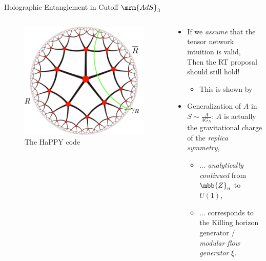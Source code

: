 \documentclass[aspectratio=169,10pt
	,noamsthm
]{beamer}
\begin{document}
\begin{frame}{Holographic Entanglement in Cutoff $\mrm{AdS}_3$}{%
	\textcite{Lewkowycz:2019xse}%
}
	\begin{columns}
	\begin{column}{.35\textwidth}
		\begin{figure}[!h]
		\centering
		\includegraphics[height=.55\textheight]{img/cutnetwork.pdf}
		\caption{The HaPPY code \cite{Pastawski:2015qua,Harlow:2018fse}}
		\end{figure}
	\end{column}
	\begin{column}{.65\textwidth}
		\begin{itemize}
		\item If we \textit{assume} that the tensor network intuition is valid,\\
		Then the RT proposal should still hold!
		
			\begin{itemize}
			\item This is shown by \textcite{Lewkowycz:2019xse}
			\end{itemize}
		
	\pause
		
		\item Generalization of $A$ in $S \sim \frac{A}{4G_N}$:
		$A$ is actually the gravitational charge of the \textit{replica symmetry},
		
			\begin{itemize}
			\item ... \textit{analytically continued} from $\mbb{Z}_n$ to $U(1)$,
		\vspace{-.5ex}
			\item ... corresponds to the Killing horizon generator / \textit{modular flow generator} $\xi$. 
			

\end{itemize}
\end{itemize}
\end{column}
\end{columns}
\end{frame}
\end{document}
